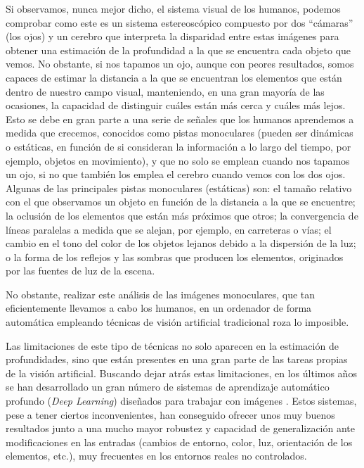 Si observamos, nunca mejor dicho, el sistema visual de los humanos, podemos comprobar como este es un sistema estereoscópico compuesto por dos  ``cámaras''  (los ojos) y un cerebro que interpreta la disparidad entre estas imágenes para obtener una estimación de la profundidad a la que se encuentra cada objeto que vemos. No obstante, si nos tapamos un ojo, aunque con peores resultados, somos capaces de estimar la distancia a la que se encuentran los elementos que están dentro de nuestro campo visual, manteniendo, en una gran mayoría de las ocasiones, la capacidad de distinguir cuáles están más cerca y cuáles más lejos. Esto se debe en gran parte a una serie de señales que los humanos aprendemos a medida que crecemos, conocidos como pistas monoculares (pueden ser dinámicas o estáticas, en función de si consideran la información a lo largo del tiempo, por ejemplo, objetos en movimiento), y que no solo se emplean cuando nos tapamos un ojo, si no que también los emplea el cerebro cuando vemos con los dos ojos. Algunas de las principales pistas monoculares (estáticas) \cite{Kalloniatis2005-pc} son: el tamaño relativo con el que observamos un objeto en función de la distancia a la que se encuentre; la oclusión de los elementos que están más próximos que otros; la convergencia de líneas paralelas a medida que se alejan, por ejemplo, en carreteras o vías; el cambio en el tono del color de los objetos lejanos debido a la dispersión de la luz; o la forma de los reflejos y las sombras que producen los elementos, originados por las fuentes de luz de la escena.

No obstante, realizar este análisis de las imágenes monoculares, que tan eficientemente llevamos a cabo los humanos, en un ordenador de forma automática empleando técnicas de visión artificial tradicional roza lo imposible. 

Las limitaciones de este tipo de técnicas no solo aparecen en la estimación de profundidades, sino que están presentes en una gran parte de las tareas propias de la visión artificial. Buscando dejar atrás estas limitaciones, en los últimos años se han desarrollado un gran número de sistemas de aprendizaje automático profundo (\textit{Deep Learning}) diseñados para trabajar con imágenes \cite{alexnet, yolov3, unet}. Estos sistemas, pese a tener ciertos inconvenientes, han conseguido ofrecer unos muy buenos resultados junto a una mucho mayor robustez y capacidad de generalización ante modificaciones en las entradas (cambios de entorno, color, luz, orientación de los elementos, etc.), muy frecuentes en los entornos reales no controlados.

